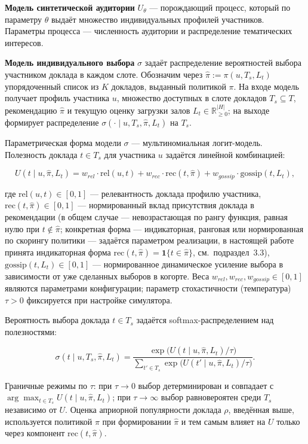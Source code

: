 \textbf{Модель синтетической аудитории} $U_\theta$ --- порождающий процесс, который по параметру $\theta$ выдаёт множество индивидуальных профилей участников. Параметры процесса --- численность аудитории и распределение тематических интересов.

\textbf{Модель индивидуального выбора} $\sigma$ задаёт распределение вероятностей выбора участником доклада в каждом слоте. Обозначим через $\hat\pi := \pi(u, T_s, L_t)$ упорядоченный список из $K$ докладов, выданный политикой $\pi$. На входе модель получает профиль участника $u$, множество доступных в слоте докладов $T_s \subseteq T$, рекомендацию $\hat\pi$ и текущую оценку загрузки залов $L_t \in \mathbb{R}_{\geq 0}^{|H|}$; на выходе формирует распределение $\sigma(\cdot \mid u, T_s, \hat\pi, L_t)$ на $T_s$.

Параметрическая форма модели $\sigma$ --- мультиномиальная логит-модель. Полезность доклада $t \in T_s$ для участника $u$ задаётся линейной комбинацией:

\[
U(t \mid u, \hat\pi, L_t) = w_{rel} \cdot \mathrm{rel}(u, t) + w_{rec} \cdot \mathrm{rec}(t, \hat\pi) + w_{gossip} \cdot \mathrm{gossip}(t, L_t),
\]

\noindent где $\mathrm{rel}(u, t) \in [0, 1]$ --- релевантность доклада профилю участника, $\mathrm{rec}(t, \hat\pi) \in [0, 1]$ --- нормированный вклад присутствия доклада в рекомендации (в общем случае --- невозрастающая по рангу функция, равная нулю при $t \notin \hat\pi$; конкретная форма --- индикаторная, ранговая или нормированная по скорингу политики --- задаётся параметром реализации, в настоящей работе принята индикаторная форма $\mathrm{rec}(t, \hat\pi) = \mathbf{1}\{t \in \hat\pi\}$, см.~подраздел~3.3), $\mathrm{gossip}(t, L_t) \in [0, 1]$ --- нормированное динамическое усиление выбора в зависимости от уже сделанных выборов в когорте. Веса $w_{rel}, w_{rec}, w_{gossip} \in [0, 1]$ являются параметрами конфигурации; параметр стохастичности (температура) $\tau > 0$ фиксируется при настройке симулятора.

Вероятность выбора доклада $t \in T_s$ задаётся softmax-распределением над полезностями:

\[
\sigma(t \mid u, T_s, \hat\pi, L_t) = \frac{\exp\bigl(U(t \mid u, \hat\pi, L_t) / \tau\bigr)}{\sum_{t' \in T_s} \exp\bigl(U(t' \mid u, \hat\pi, L_t) / \tau\bigr)}.
\]

Граничные режимы по $\tau$: при $\tau \to 0$ выбор детерминирован и совпадает с $\arg\max_{t \in T_s} U(t \mid u, \hat\pi, L_t)$; при $\tau \to \infty$ выбор равновероятен среди $T_s$ независимо от $U$. Оценка априорной популярности доклада $\rho$, введённая выше, используется политикой $\pi$ при формировании $\hat\pi$ и тем самым влияет на $U$ только через компонент $\mathrm{rec}(t, \hat\pi)$.

